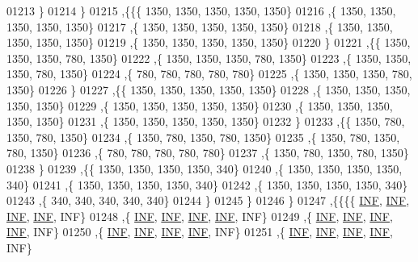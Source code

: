 \begin{DoxyCode}
01213    \}
01214   \}
01215  ,\{\{\{  1350,  1350,  1350,  1350,  1350\}
01216    ,\{  1350,  1350,  1350,  1350,  1350\}
01217    ,\{  1350,  1350,  1350,  1350,  1350\}
01218    ,\{  1350,  1350,  1350,  1350,  1350\}
01219    ,\{  1350,  1350,  1350,  1350,  1350\}
01220    \}
01221   ,\{\{  1350,  1350,  1350,   780,  1350\}
01222    ,\{  1350,  1350,  1350,   780,  1350\}
01223    ,\{  1350,  1350,  1350,   780,  1350\}
01224    ,\{   780,   780,   780,   780,   780\}
01225    ,\{  1350,  1350,  1350,   780,  1350\}
01226    \}
01227   ,\{\{  1350,  1350,  1350,  1350,  1350\}
01228    ,\{  1350,  1350,  1350,  1350,  1350\}
01229    ,\{  1350,  1350,  1350,  1350,  1350\}
01230    ,\{  1350,  1350,  1350,  1350,  1350\}
01231    ,\{  1350,  1350,  1350,  1350,  1350\}
01232    \}
01233   ,\{\{  1350,   780,  1350,   780,  1350\}
01234    ,\{  1350,   780,  1350,   780,  1350\}
01235    ,\{  1350,   780,  1350,   780,  1350\}
01236    ,\{   780,   780,   780,   780,   780\}
01237    ,\{  1350,   780,  1350,   780,  1350\}
01238    \}
01239   ,\{\{  1350,  1350,  1350,  1350,   340\}
01240    ,\{  1350,  1350,  1350,  1350,   340\}
01241    ,\{  1350,  1350,  1350,  1350,   340\}
01242    ,\{  1350,  1350,  1350,  1350,   340\}
01243    ,\{   340,   340,   340,   340,   340\}
01244    \}
01245   \}
01246  \}
01247 ,\{\{\{\{   \hyperlink{energy__const_8h_a12c2040f25d8e3a7b9e1c2024c618cb6}{INF},   \hyperlink{energy__const_8h_a12c2040f25d8e3a7b9e1c2024c618cb6}{INF},   \hyperlink{energy__const_8h_a12c2040f25d8e3a7b9e1c2024c618cb6}{INF},   \hyperlink{energy__const_8h_a12c2040f25d8e3a7b9e1c2024c618cb6}{INF},   INF\}
01248    ,\{   \hyperlink{energy__const_8h_a12c2040f25d8e3a7b9e1c2024c618cb6}{INF},   \hyperlink{energy__const_8h_a12c2040f25d8e3a7b9e1c2024c618cb6}{INF},   \hyperlink{energy__const_8h_a12c2040f25d8e3a7b9e1c2024c618cb6}{INF},   \hyperlink{energy__const_8h_a12c2040f25d8e3a7b9e1c2024c618cb6}{INF},   INF\}
01249    ,\{   \hyperlink{energy__const_8h_a12c2040f25d8e3a7b9e1c2024c618cb6}{INF},   \hyperlink{energy__const_8h_a12c2040f25d8e3a7b9e1c2024c618cb6}{INF},   \hyperlink{energy__const_8h_a12c2040f25d8e3a7b9e1c2024c618cb6}{INF},   \hyperlink{energy__const_8h_a12c2040f25d8e3a7b9e1c2024c618cb6}{INF},   INF\}
01250    ,\{   \hyperlink{energy__const_8h_a12c2040f25d8e3a7b9e1c2024c618cb6}{INF},   \hyperlink{energy__const_8h_a12c2040f25d8e3a7b9e1c2024c618cb6}{INF},   \hyperlink{energy__const_8h_a12c2040f25d8e3a7b9e1c2024c618cb6}{INF},   \hyperlink{energy__const_8h_a12c2040f25d8e3a7b9e1c2024c618cb6}{INF},   INF\}
01251    ,\{   \hyperlink{energy__const_8h_a12c2040f25d8e3a7b9e1c2024c618cb6}{INF},   \hyperlink{energy__const_8h_a12c2040f25d8e3a7b9e1c2024c618cb6}{INF},   \hyperlink{energy__const_8h_a12c2040f25d8e3a7b9e1c2024c618cb6}{INF},   \hyperlink{energy__const_8h_a12c2040f25d8e3a7b9e1c2024c618cb6}{INF},   INF\}

\end{DoxyCode}
